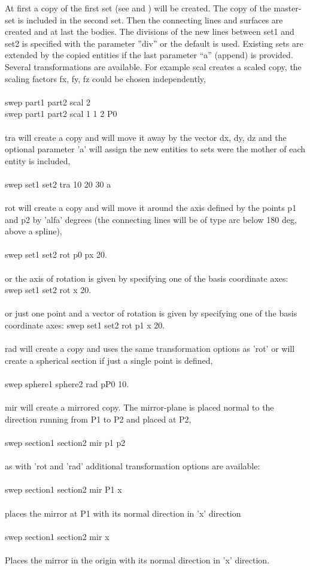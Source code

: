 \documentclass{article}
\begin{document}
At first a copy of the first set (see  and ) will be created. The copy of the master-set is included in the second set. Then the connecting lines and surfaces are created and at last the bodies. The divisions of the new lines between set1 and set2 is specified with the parameter ''div'' or the default is used. Existing sets are extended by the copied entities if the last parameter ``a'' (append) is provided. Several transformations are available. For example scal creates a scaled copy, the scaling factors fx, fy, fz could be chosen independently,\\\\
swep part1 part2 scal 2 \\
swep part1 part2 scal 1 1 2 P0\\\\
tra will create a copy and will move it away by the vector dx, dy, dz and the optional parameter 'a' will assign the new entities to sets were the mother of each entity is included,\\\\
swep set1 set2 tra 10 20 30 a\\\\
rot will create a copy and will move it around the axis defined by the points p1 and p2 by 'alfa' degrees (the connecting lines will be of type arc below 180 deg, above a spline),\\\\
swep set1 set2 rot p0 px 20.\\\\
or the axis of rotation is given by specifying one of the basis coordinate axes:
swep set1 set2 rot x 20.\\\\
or just one point and a vector of rotation is given by specifying one of the basis coordinate axes:
swep set1 set2 rot p1 x 20.\\\\
rad will create a copy and uses the same transformation options as 'rot' or will create a spherical section if just a single point is defined,\\\\
swep sphere1 sphere2 rad pP0 10.\\\\
mir will create a mirrored copy. The mirror-plane is placed normal to the direction running from P1 to P2 and placed at P2,\\\\
swep section1 section2 mir p1 p2\\\\
as with 'rot and 'rad' additional transformation options are available:\\\\
swep section1 section2 mir P1 x\\\\
places the mirror at P1 with its normal direction in 'x' direction\\\\
swep section1 section2 mir x\\\\
Places the mirror in the origin with its normal direction in 'x' direction.
\end{document}

